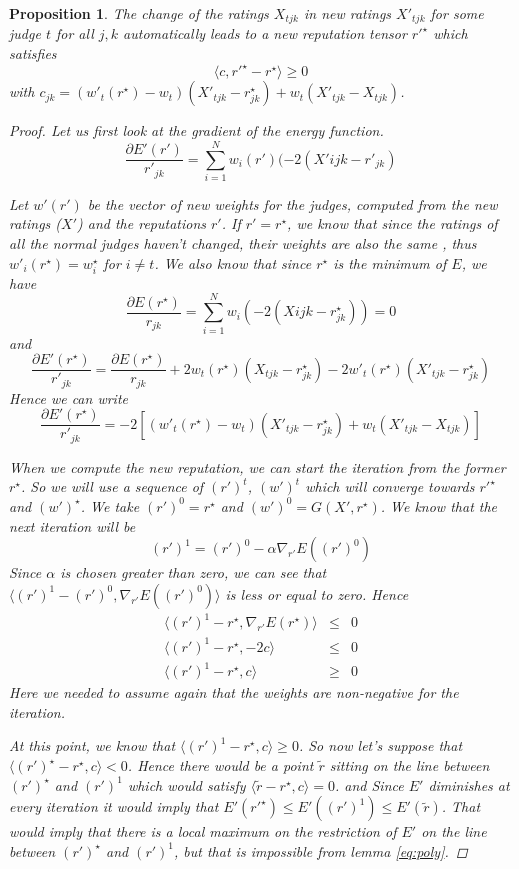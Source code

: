 \documentclass[12pt,a4paper]{article}
\newtheorem{proposition}{Proposition}
\begin{document}
\begin{proposition}
The change of the ratings $X_{tjk}$ in new ratings $X'_{tjk}$ for some judge $t$ for all $j,k$ automatically leads to a new reputation tensor $r'^{\star}$ which satisfies 
$$ \langle c, r'^{\star} - r^{\star} \rangle \geq 0$$
with $c_{jk} = ( w'_t(r^{\star})- w_t) (X'_{tjk}-r^{\star}_{jk}) + w_t(X'_{tjk}-X_{tjk}) $.
\label{pr:hyperp}
\begin{proof}
Let us first look at the gradient of the energy function.
$$\frac{\partial E'(r')}{r'_{jk}} = \sum_{i=1}^N w_i(r') (-2 (X'{ijk}-r'_{jk})$$

Let $w'(r')$ be the vector of new weights for the judges, computed from the new ratings ($X'$) and the reputations $r'$.
If $r' = r^{\star}$, we know that since the ratings of all the normal judges haven't changed, their weights are also the same , thus $w'_i(r^{\star}) = w_i^{\star}$ for $i \neq t$. We also know that since $r^{\star}$ is the minimum of $E$, we have 
$$ \frac{\partial E(r^{\star})}{r_{jk}} = \sum_{i=1}^N w_i (-2 (X{ijk}-r^{\star}_{jk})) = 0$$
and 
$$ \frac{\partial E'(r^{\star})}{r'_{jk}} = \frac{\partial E(r^{\star})}{r_{jk}}+2w_t(r^{\star})(X_{tjk}-r^{\star}_{jk})-2 w'_t(r^{\star}) (X'_{tjk}-r^{\star}_{jk}) $$
Hence we can write
$$ \frac{\partial E'(r^{\star})}{r'_{jk}} = -2 \left[ ( w'_t(r^{\star})- w_t) (X'_{tjk}-r^{\star}_{jk}) + w_t(X'_{tjk}-X_{tjk}) \right]$$

When we compute the new reputation, we can start the iteration from the former $r^{\star}$. So we will use a sequence of $(r')^t$, $(w')^t$ which will converge towards $r'^{\star}$ and $(w')^{\star}$.
We take $(r')^0 = r^{\star}$ and $(w')^0 = G(X',r^{\star})$. We know that the next iteration will be 
$$ (r')^1 = (r')^0 - \alpha \nabla_{r'}E((r')^0)$$
Since $\alpha$ is chosen greater than zero, we can see that $\langle (r')^1 - (r')^0, \nabla_{r'}E((r')^0) \rangle$ is less or equal to zero.
Hence 
\begin{eqnarray*}
\langle (r')^1 - r^{\star}, \nabla_{r'}E(r^{\star})\rangle & \leq & 0\\
\langle (r')^1 - r^{\star}, -2 c\rangle & \leq & 0\\
\langle (r')^1 - r^{\star}, c\rangle & \geq & 0
\end{eqnarray*}
Here we needed to assume again that the weights are non-negative for the iteration.

At this point, we know that $\langle (r')^1 - r^{\star}, c\rangle  \geq  0$.
So now let's suppose that $\langle(r')^{\star} - r^{\star}, c\rangle  <  0$. Hence there would be a point $\tilde{r}$ sitting on the line between $(r')^{\star}$ and $(r')^1$ which would satisfy $\langle \tilde{r}- r^{\star}, c\rangle = 0 $. and Since $E'$ diminishes at every iteration it would imply that $E'(r'^{\star}) \leq E'((r')^1) \leq E'(\tilde{r}) $. That would imply that there is a local maximum on the restriction of $E'$ on the line between $(r')^{\star}$ and $(r')^1$, but that is impossible from lemma \ref{eq:poly}.
\end{proof}

\end{proposition}
\end{document}
